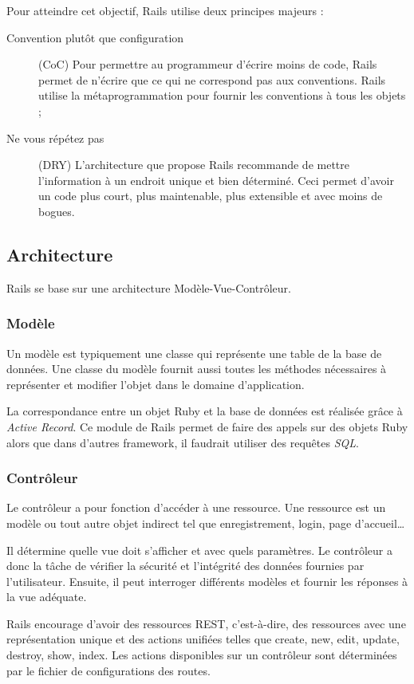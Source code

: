 Pour atteindre cet objectif, Rails utilise deux principes majeurs :
\begin{description}
  \item[Convention plutôt que configuration] (CoC) Pour permettre au programmeur d'écrire moins de code, Rails permet de n'écrire que ce qui ne correspond pas aux conventions. Rails utilise la métaprogrammation pour fournir les conventions à tous les objets ;
  \item[Ne vous répétez  pas] (DRY) L'architecture que propose Rails recommande de mettre l'information à un endroit unique et bien déterminé. Ceci permet d'avoir un code plus court, plus maintenable, plus extensible et avec moins de bogues.
\end{description}

\subsection{Architecture}
Rails se base sur une architecture Modèle-Vue-Contrôleur. %
\subsubsection{Modèle} 
Un modèle est typiquement une classe qui représente une table de la base de données. Une classe du modèle fournit aussi toutes les méthodes nécessaires à représenter et modifier l'objet dans le domaine d'application.

La correspondance entre un objet Ruby et la base de données est réalisée grâce à \textit{Active Record}. Ce module de Rails permet de faire des appels sur des objets Ruby alors que dans d'autres framework, il faudrait utiliser des requêtes \textit{SQL}. \label{active-record}
  
\subsubsection{Contrôleur}
\label{controleur}
Le contrôleur a pour fonction d'accéder à une ressource. Une ressource est un modèle ou tout autre objet indirect tel que enregistrement, login, page d'accueil\ldots  

Il détermine quelle vue doit s'afficher et avec quels paramètres. Le contrôleur a donc la tâche de vérifier la sécurité et l'intégrité des données fournies par l'utilisateur. Ensuite, il peut interroger différents modèles et fournir les réponses à la vue adéquate.

Rails encourage d'avoir des ressources REST, c'est-à-dire, des ressources avec une représentation unique et des actions unifiées telles que create, new, edit, update, destroy, show, index. Les actions disponibles sur un contrôleur sont déterminées par le fichier de configurations des routes.

